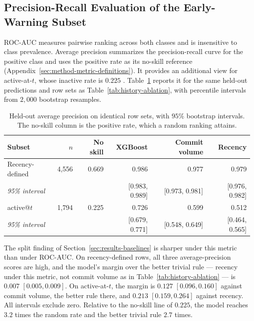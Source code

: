 \subsection{Precision-Recall Evaluation of the Early-Warning Subset}
\label{sec:results-precision-recall}

ROC-AUC measures pairwise ranking across both classes and is insensitive to class
prevalence. Average precision summarizes the precision-recall curve for the
positive class and uses the positive rate as its no-skill reference
(Appendix~\ref{sec:method-metric-definitions}). It provides an additional view
for active-at-\(t\), whose inactive rate is \(0.225\)
\cite{saito2015precision}. Table~\ref{tab:average-precision} reports it for the
same held-out predictions and row sets as Table~\ref{tab:history-ablation}, with
percentile intervals from \(2{,}000\) bootstrap resamples.

\begin{table}[htbp]
  \centering
  \caption{Held-out average precision on identical row sets, with \(95\%\)
  bootstrap intervals. The no-skill column is the positive rate, which a random
  ranking attains.}
  \label{tab:average-precision}
  \small
  \begin{tabular}{lrrrrr}
    \toprule
    Subset & \(n\) & No skill & XGBoost & Commit volume & Recency \\
    \midrule
    Recency-defined & 4{,}556 & 0.669 & 0.986 & 0.977 & 0.979 \\
    \multicolumn{2}{l}{\quad \emph{95\% interval}} & & [0.983, 0.989] & [0.973, 0.981] & [0.976, 0.982] \\
    active@\(t\)    & 1{,}794 & 0.225 & 0.726 & 0.599 & 0.512 \\
    \multicolumn{2}{l}{\quad \emph{95\% interval}} & & [0.679, 0.771] & [0.548, 0.649] & [0.464, 0.565] \\
    \bottomrule
  \end{tabular}
\end{table}

The split finding of Section~\ref{sec:results-baselines} is sharper under this
metric than under ROC-AUC. On recency-defined rows, all three average-precision
scores are high, and the model's margin over the better trivial rule --- recency
under this metric, not commit volume as in Table~\ref{tab:history-ablation} --- is
\(0.007\) \([0.005, 0.009]\). On active-at-\(t\), the margin is \(0.127\)
\([0.096, 0.160]\) against commit volume, the better rule there, and \(0.213\)
\([0.159, 0.264]\) against recency. All intervals exclude zero. Relative to the
no-skill line of \(0.225\), the model reaches \(3.2\) times the random rate and
the better trivial rule \(2.7\) times.


